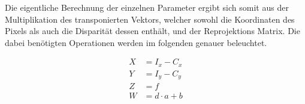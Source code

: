 \noindent
Die eigentliche Berechnung der einzelnen Parameter ergibt sich somit aus der Multiplikation des transponierten Vektors, welcher sowohl die Koordinaten des Pixels als auch die Disparität dessen enthält, und der Reprojektions Matrix. Die dabei benötigten Operationen werden im folgenden genauer beleuchtet.


\begin{equation}
  \begin{aligned}
        X &= I_x - C_x\\
        Y &= I_y - C_y\\
        Z &= f\\
        W &= d \cdot a + b
  \end{aligned}
\end{equation}
